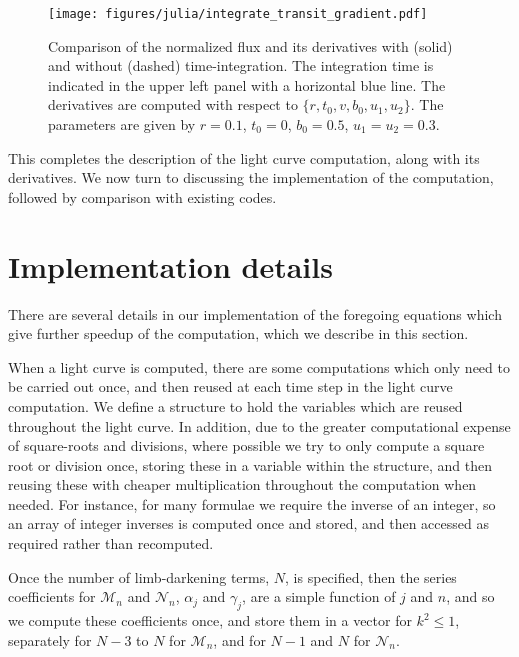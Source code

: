 \documentclass[modern]{aastex61}
\begin{document}
\begin{figure}
    \begin{centering}
    \texttt{[image: figures/julia/integrate\_transit\_gradient.pdf]}
    \caption{Comparison of the normalized flux and its derivatives with (solid) and
    without (dashed) time-integration.  The integration time is indicated in the
    upper left panel with a horizontal blue line. The derivatives are computed with
    respect to $\{r,t_0,v,b_0,u_1,u_2\}$.  The parameters are given by $r=0.1$,
    $t_0 = 0$, $b_0=0.5$, $u_1=u_2=0.3$. }
    \label{fig:integrated_derivs}
    \end{centering}
\end{figure}

This completes the description of the light curve computation, along
with its derivatives.  We now turn to discussing the implementation of
the computation, followed by comparison with existing codes.

\section{Implementation details}

There are several details in our implementation of the foregoing equations
which give further speedup of the computation, which we describe in this
section.

When a light curve is computed, there are some computations which only
need to be carried out once, and then reused at each time step in the
light curve computation.  
We define a structure to hold the variables
which are reused throughout the light curve.  In addition, due to the greater 
computational expense of square-roots and divisions, where possible we try 
to only compute a square root or division once, storing these in a variable
within the structure, and then reusing these with cheaper multiplication 
throughout the computation when needed.  For instance, for many formulae we 
require the inverse of an integer, so an array of integer inverses is computed 
once and stored, and then accessed as required rather than recomputed.

Once the number of limb-darkening
terms, $N$, is specified, then the series coefficients for $\mathcal{M}_n$
and $\mathcal{N}_n$, $\alpha_j$ and $\gamma_j$, are a simple function of $j$ 
and $n$, and so we compute these coefficients once, and store them in a vector 
for $k^2 \le 1$, separately for $N-3$ to $N$ for $\mathcal{M}_n$, and for 
$N-1$ and $N$ for $\mathcal{N}_n$.
\end{document}
